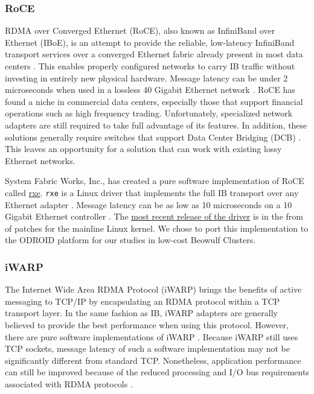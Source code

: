 \documentclass[11pt]{book}
\begin{document}
\subsubsection{RoCE}

RDMA over Converged Ethernet (RoCE), also known as InfiniBand over Ethernet (IBoE), is an
attempt to provide the reliable, low-latency InfiniBand transport services over a
converged Ethernet fabric already present in most data centers
\cite{InfiniBandTARoCE-10,roce-announce}.  This enables properly configured networks to
carry IB traffic without investing in entirely new physical hardware.  Message latency can
be under 2 microseconds when used in a lossless 40 Gigabit Ethernet network
\cite{vienne-12}.  RoCE has found a niche in commercial data centers, especially those
that support financial operations such as high frequency trading.  Unfortunately,
specialized network adapters are still required to take full advantage of its features.
In addition, these solutions generally require switches that support Data Center Bridging
(DCB) \cite{InfiniBandTARoCE-10}.  This leaves an opportunity for a solution that can work
with existing lossy Ethernet networks.

System Fabric Works, Inc., has created a pure software implementation of RoCE called
\href{http://www.systemfabricworks.com/downloads/roce}{rxe}.  \verb;rxe; is a Linux driver
that implements the full IB transport over any Ethernet adapter \cite{pearson-10}.
Message latency can be as low as 10 microseconds on a 10 Gigabit Ethernet controller
\cite{pearson-10}.  The \href{http://support.systemfabricworks.com/downloads/rxe/}{most
  recent release of the driver} is in the from of patches for the mainline Linux kernel.
We chose to port this implementation to the ODROID platform for our studies in low-cost
Beowulf Clusters.

\subsubsection{iWARP}

The Internet Wide Area RDMA Protocol (iWARP) brings the benefits of active messaging to
TCP/IP by encapsulating an RDMA protocol within a TCP transport layer.  In the same
fashion as IB, iWARP adapters are generally believed to provide the best performance when
using this protocol.  However, there are pure software implementations of iWARP
\cite{neeser-10}.  Because iWARP still uses TCP sockets, message latency of such a
software implementation may not be significantly different from standard TCP.
Nonetheless, application performance can still be improved because of the reduced
processing and I/O bus requirements associated with RDMA protocols \cite{narravula-07}.
\end{document}
